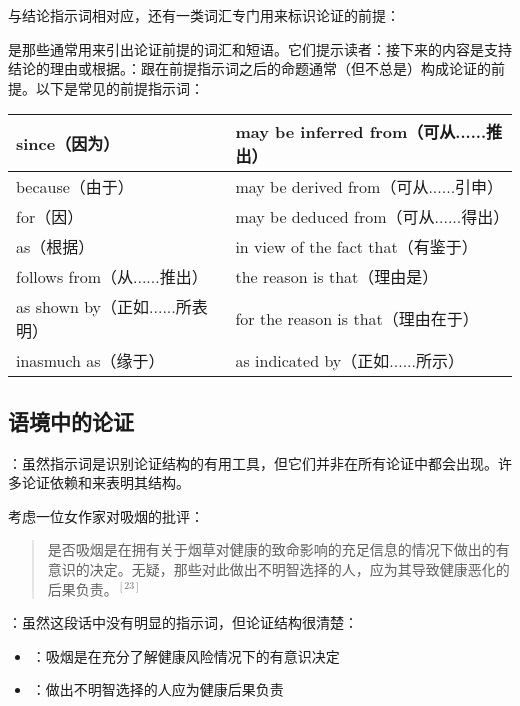 与结论指示词相对应，还有一类词汇专门用来标识论证的前提：

\begin{theorembox}[title=前提指示词]
是那些通常用来引出论证前提的词汇和短语。它们提示读者：接下来的内容是支持结论的理由或根据。：跟在前提指示词之后的命题通常（但不总是）构成论证的前提。以下是常见的前提指示词：
\end{theorembox}

\begin{center}
\begin{tabular}{|l|l|}
\hline
since（因为） & may be inferred from（可从......推出） \\
\hline
because（由于） & may be derived from（可从......引申） \\
\hline
for（因） & may be deduced from（可从......得出） \\
\hline
as（根据） & in view of the fact that（有鉴于） \\
\hline
follows from（从......推出） & the reason is that（理由是） \\
\hline
as shown by（正如......所表明） & for the reason is that（理由在于） \\
\hline
inasmuch as（缘于） & as indicated by（正如......所示） \\
\hline
\end{tabular}
\end{center}


\subsection{语境中的论证}

：虽然指示词是识别论证结构的有用工具，但它们并非在所有论证中都会出现。许多论证依赖和来表明其结构。

\begin{examplebox}[title=无指示词的论证识别]
考虑一位女作家对吸烟的批评：
\begin{quotation}
是否吸烟是在拥有关于烟草对健康的致命影响的充足信息的情况下做出的有意识的决定。无疑，那些对此做出不明智选择的人，应为其导致健康恶化的后果负责。${}^{[23]}$
\end{quotation}

：虽然这段话中没有明显的指示词，但论证结构很清楚：
\begin{itemize}
  \item {}：吸烟是在充分了解健康风险情况下的有意识决定
  \item {}：做出不明智选择的人应为健康后果负责
\end{itemize}
\end{examplebox}

